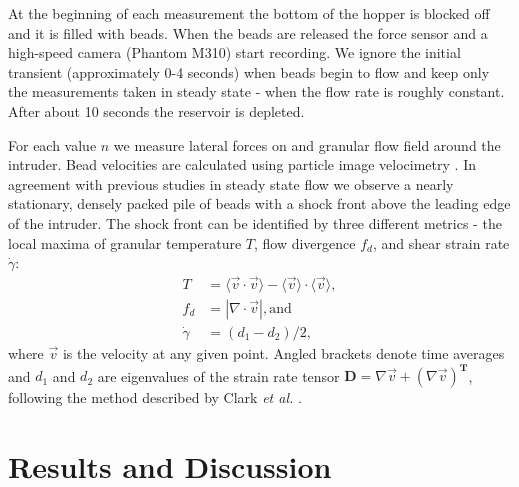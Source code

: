 At the beginning of each measurement the bottom of the hopper is blocked off and it is filled with beads. When the beads are released the force sensor and a high-speed camera (Phantom M310) start recording. We ignore the initial transient (approximately 0-4 seconds) when beads begin to flow and keep only the measurements taken in steady state - when the flow rate is roughly constant.  After about 10 seconds the reservoir is depleted.

For each value $n$ we measure lateral forces on and granular flow field around the intruder. Bead velocities are calculated using particle image velocimetry \cite{thielicke_pivlab_2014}. In agreement with previous studies \cite{amarouchene_dynamic_2001, wassgren_dilute_2003, knoll_numerical_2007, boudet_shock_2008, meyer_transient_2013, vilquin_structure_2016} in steady state flow we observe a nearly stationary, densely packed pile of beads with a shock front above the leading edge of the intruder. The shock front can be identified by three different metrics - the local maxima of granular temperature $T$, flow divergence $f_d$, and shear strain rate $\dot\gamma$: 
\begin{align} 
T &= \langle \vec{v}\cdot \vec{v} \rangle - \langle\vec{v} \rangle \cdot \langle\vec{v} \rangle, \label{gTemp}\\ 
f_d &= | \nabla\cdot\vec{v}|, \textrm{and} \label{flowDiv}\\ 
\dot{\gamma} &= (d_{1}-d_{2})/2 \label{shearRate}, 
\end{align}
where $\vec{v}$ is the velocity at any given point. Angled brackets denote time averages and $d_{1}$ and $d_{2}$ are eigenvalues of the strain rate tensor $\textbf{D}=\nabla \vec{v}+(\nabla \vec{v})^{\textbf{T}}$, following the method described by Clark \textit{et al.} \cite{clark_steady_2016}. 

\section{Results and Discussion}

